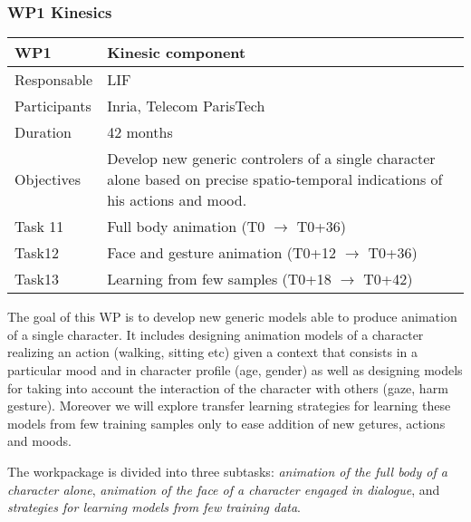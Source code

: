 

\subsubsection{WP1 Kinesics}


\begin{center}
\begin{tabular}{|p{3cm}|p{8cm}|}\hline
WP1 &  Kinesic component \\\hline
Responsable &  LIF  \\\hline
Participants &  Inria, Telecom ParisTech\\\hline
Duration  &  42 months  \\\hline
Objectives &  Develop new generic controlers of a single character alone based on precise spatio-temporal indications of his actions and mood. \\\hline
Task 11 & Full body animation  (T0 $\rightarrow$ T0+36) \\\hline
Task12 &  Face and gesture animation (T0+12 $\rightarrow$ T0+36) \\\hline
Task13 &  Learning from few samples (T0+18 $\rightarrow$ T0+42) \\\hline
\end{tabular}
\end{center}



The goal of this WP is to develop new generic models able to produce animation of a single character. It includes designing animation models of a character realizing an action (walking, sitting etc) given a context that consists in a particular mood and in character profile (age, gender) as well as designing models for taking into account the interaction of the character with others (gaze, harm gesture). Moreover we will explore transfer learning strategies for learning these models from few training samples only to ease addition of new getures, actions and moods. 

The workpackage is divided into three subtasks: {\it animation of the full body of a character alone}, {\it animation of the face of a character engaged in dialogue}, and {\it strategies for learning models from few training data}.

 


